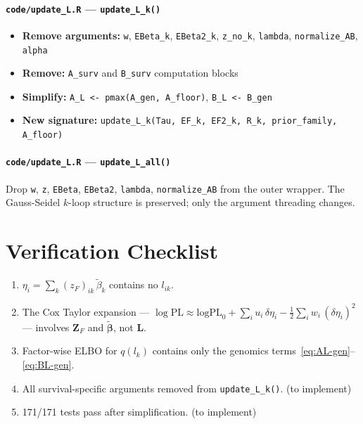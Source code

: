 \documentclass[11pt]{article}
\begin{document}
\paragraph{\texttt{code/update\_L.R} — \texttt{update\_L\_k()}}
\begin{itemize}
  \item \textbf{Remove arguments:} \texttt{w}, \texttt{EBeta\_k}, \texttt{EBeta2\_k},
        \texttt{z\_no\_k}, \texttt{lambda}, \texttt{normalize\_AB}, \texttt{alpha}
  \item \textbf{Remove:} \texttt{A\_surv} and \texttt{B\_surv} computation blocks
  \item \textbf{Simplify:} \texttt{A\_L <- pmax(A\_gen, A\_floor)},\;
        \texttt{B\_L <- B\_gen}
  \item \textbf{New signature:}
        \texttt{update\_L\_k(Tau, EF\_k, EF2\_k, R\_k, prior\_family, A\_floor)}
\end{itemize}

\paragraph{\texttt{code/update\_L.R} — \texttt{update\_L\_all()}}
Drop \texttt{w}, \texttt{z}, \texttt{EBeta}, \texttt{EBeta2}, \texttt{lambda},
\texttt{normalize\_AB} from the outer wrapper. The Gauss-Seidel $k$-loop structure
is preserved; only the argument threading changes.

\section{Verification Checklist}

\begin{verifybox}[D1 Verification]
\begin{enumerate}
  \item $\eta_i = \sum_k (z_F)_{ik}\,\tilde{\beta}_k$ contains no $l_{ik}$. \checkmark
  \item The Cox Taylor expansion — $\log \mathrm{PL} \approx \mathrm{logPL}_0
        + \sum_i u_i\,\delta\eta_i - \tfrac{1}{2}\sum_i w_i\,(\delta\eta_i)^2$
        — involves $\mathbf{Z}_F$ and $\tilde{\boldsymbol{\beta}}$, not $\mathbf{L}$. \checkmark
  \item Factor-wise ELBO for $q(l_k)$ contains only the genomics
        terms~\eqref{eq:AL-gen}--\eqref{eq:BL-gen}. \checkmark
  \item All survival-specific arguments removed from \texttt{update\_L\_k()}. (to implement)
  \item 171/171 tests pass after simplification. (to implement)
\end{enumerate}
\end{verifybox}
\end{document}
